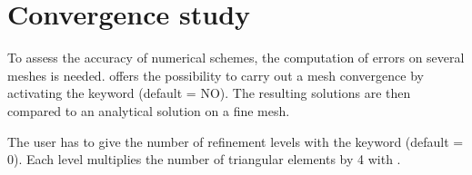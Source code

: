 \section{Convergence study}

To assess the accuracy of numerical schemes, the computation of errors
on several meshes is needed.
 offers the possibility to carry out a mesh convergence
by activating the keyword  (default = NO).
The resulting solutions are then compared to an analytical solution
on a fine mesh.

The user has to give the number of refinement levels with the keyword
 (default = 0).
Each level multiplies the number of triangular elements by 4 with \stbtel.
